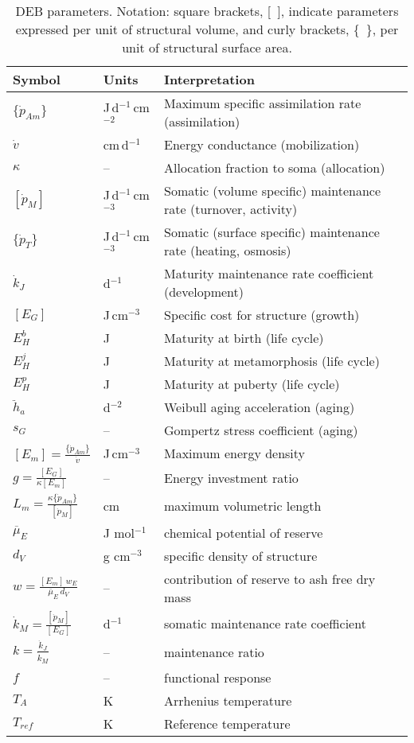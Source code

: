 \documentclass{article}
\begin{document}
\begin{table}%
    \caption{\protect\small\label{tab:DEB_pars}  DEB parameters. Notation: square brackets, {[}~{]}, indicate parameters expressed per unit of structural volume, and curly brackets, \{~\}, per unit of structural surface area.}
    \centering
    \begin{tabular}{lll} 
    \hline 
    Symbol & Units & Interpretation   \\ [0.75ex]
     \hline \hline
$\{\dot{p}_{Am}\}$ &  J\,d$^{-1}$\,cm$^{-2}$ & Maximum specific assimilation rate (assimilation)\tabularnewline
$\dot{v}$  & cm\,d$^{-1}$ & Energy conductance (mobilization)\tabularnewline 
$\kappa$ & --& Allocation fraction to soma (allocation) \tabularnewline    
$[\dot{p}_M]$  & J\,d$^{-1}$\,cm$^{-3}$ &  Somatic (volume specific)  maintenance rate  (turnover, activity) \tabularnewline
$\{\dot{p}_T\}$  & J\,d$^{-1}$\,cm$^{-3}$ &  Somatic (surface specific)  maintenance rate  (heating, osmosis) \tabularnewline
$\dot{k}_J$  & d$^{-1}$ &   Maturity maintenance rate coefficient  (development)\tabularnewline
$[E_G]$ & J\,cm$^{-3}$ & Specific cost for structure (growth)\tabularnewline 
$E_H^b$  & J &  Maturity at birth  (life cycle)\tabularnewline   
$E_H^j$ & J &  Maturity at metamorphosis (life cycle) \tabularnewline    
$E_H^p$ & J &  {Maturity at puberty} (life cycle)  \tabularnewline
$\ddot{h}_a$ & d$^{-2}$ & Weibull aging acceleration (aging)\tabularnewline
$s_G$ & -- & Gompertz stress coefficient (aging)\tabularnewline
\hline 
$[E_m] = \frac{\{\dot{p}_{Am}\}}{ \dot{v}}$  & J\,cm$^{-3}$ & Maximum energy density \tabularnewline
$g=\frac{[E_G]}{\kappa  [E_m]}$ & -- & Energy investment ratio\tabularnewline
$L_m = \frac{\kappa \{\dot{p}_{Am}\}}{[\dot{p}_M]}$ & cm & maximum volumetric length \tabularnewline
$\overline{\mu}_E$ & J mol$^{-1}$ & chemical potential of reserve   \tabularnewline
 $d_{V}$ & g cm$^{-3}$  & specific density of structure   \tabularnewline
$w= \frac{[E_m] \, w_E}{\overline{\mu}_E \, d_V}$ &-- & contribution of reserve to ash free dry mass \tabularnewline
$\dot{k}_M=\frac{[\dot{p}_M]}{[E_G]}$ &d$^{-1}$& somatic maintenance rate coefficient \tabularnewline
$k=\frac{\dot{k}_J}{\dot{k}_M}$ &--&  maintenance ratio  \tabularnewline
\hline
$f$ & -- & functional response  \tabularnewline
$T_A$ & K & Arrhenius temperature \tabularnewline
$T_{ref}$ & K & Reference temperature \tabularnewline
 \hline \hline
    \end{tabular}
\end{table}
\end{document}
